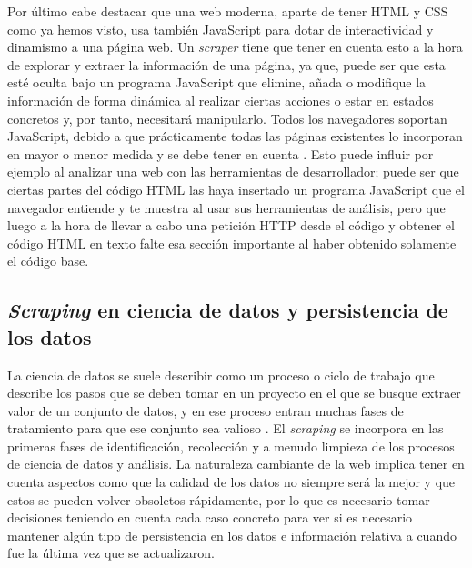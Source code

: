 Por último cabe destacar que una web moderna, aparte de tener HTML y CSS como ya
hemos visto, usa también JavaScript para dotar de interactividad y dinamismo a
una página web. Un \textit{scraper} tiene que tener en cuenta esto a la hora de
explorar y extraer la información de una página, ya que, puede ser que esta esté
oculta bajo un programa JavaScript que elimine, añada o modifique la información
de forma dinámica al realizar ciertas acciones o estar en estados concretos y,
por tanto, necesitará manipularlo. Todos los navegadores soportan JavaScript,
debido a que prácticamente todas las páginas existentes lo incorporan en mayor o
menor medida y se debe tener en cuenta \cite{apress2018scraping}. Esto puede
influir por ejemplo al analizar una web con las herramientas de desarrollador;
puede ser que ciertas partes del código HTML las haya insertado un programa
JavaScript que el navegador entiende y te muestra al usar sus herramientas de
análisis, pero que luego a la hora de llevar a cabo una petición HTTP desde el
código y obtener el código HTML en texto falte esa sección importante al haber
obtenido solamente el código base.

\subsection{\textit{Scraping} en ciencia de datos y persistencia de los datos}
La ciencia de datos se suele describir como un proceso o ciclo de trabajo que
describe los pasos que se deben tomar en un proyecto en el que se busque extraer
valor de un conjunto de datos, y en ese proceso entran muchas fases de
tratamiento para que ese conjunto sea valioso \cite{apress2018scraping}. El
\textit{scraping} se incorpora en las primeras fases de identificación,
recolección y a menudo limpieza de los procesos de ciencia de datos y análisis.
La naturaleza cambiante de la web implica tener en cuenta aspectos como que la
calidad de los datos no siempre será la mejor y que estos se pueden volver
obsoletos rápidamente, por lo que es necesario tomar decisiones teniendo en
cuenta cada caso concreto para ver si es necesario mantener algún tipo de
persistencia en los datos e información relativa a cuando fue la última vez que
se actualizaron.

